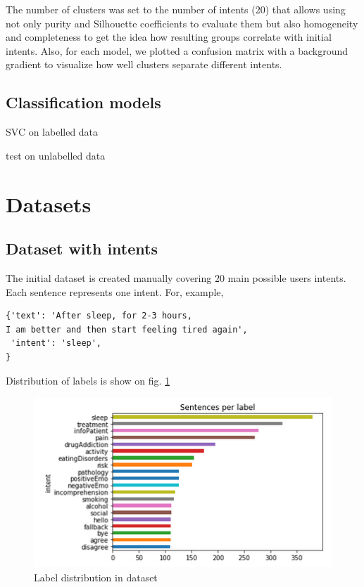 \documentclass[11pt]{article}
\begin{document}
The number of clusters was set to the number of intents (20) that allows using not only purity and Silhouette coefficients to evaluate them but also homogeneity and completeness to get the idea how resulting groups correlate with initial intents. Also, for each model, we plotted a confusion matrix with a background gradient to visualize how well clusters separate different intents.

\subsection{Classification models}

SVC on labelled data

test on unlabelled data

\section{Datasets}

\subsection{Dataset with intents}

The initial dataset is created manually covering 20 main possible users intents. Each sentence represents one intent. For, example,

\begin{lstlisting}
{'text': 'After sleep, for 2-3 hours, 
I am better and then start feeling tired again',
 'intent': 'sleep',
}
\end{lstlisting}

Distribution of labels is show on fig. \ref{figure:name}

 \begin{figure}[h]
 	\centering
 	\includegraphics[scale=0.5]{report1.png}
	\caption{Label distribution in dataset}
 \label{figure:name}
 \end{figure}
\end{document}
